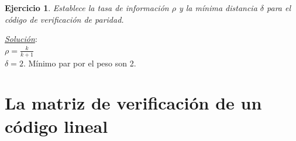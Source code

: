 \documentclass{beamer}
\theoremstyle{plain}
\theoremstyle{example}
\newtheorem{ejercicio} [Ejercicio]{Ejercicio}
\theoremstyle{example}
\begin{document}

\begin{frame}  \small \begin{ejercicio} 

Establece la tasa de información $\rho$ y la mínima distancia $\delta$ para el código de verificación de paridad.

\end{ejercicio} %
\textit{\underline{Solución}}:\\ 
\vspace{0.3cm}
$\rho = \frac{k}{k+1}$\\

\vspace{0.4cm}
$\delta = 2$.  Mínimo par por el peso son 2.
\end{frame} 






\section{La matriz de verificación de un código lineal}
\end{document}
